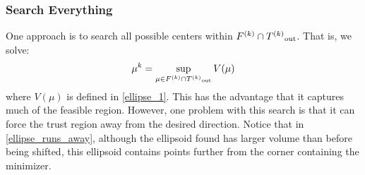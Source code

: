 

%            


\subsubsection{Search Everything}

One approach is to search all possible centers within $ {F}^{(k)} \cap {T^{(k)}}_{\text{out}} $.
That is, we solve:
$$\mu^k = \sup_{\mu \in {F}^{(k)} \cap {T^{(k)}}_{\text{out}}} V(\mu)$$
where $V(\mu)$ is defined in \cref{ellipse_1}.
This has the advantage that it captures much of the feasible region.
However, one problem with this search is that it can force the trust region away from the desired direction.
Notice that in \cref{ellipse_runs_away}, although the ellipsoid found has larger volume than before being shifted, this ellipsoid contains points further from the corner containing the minimizer.

